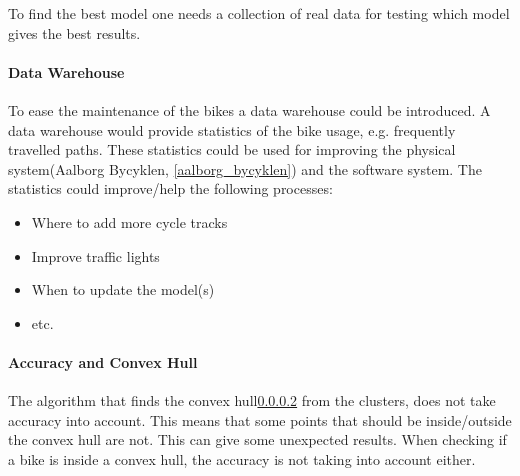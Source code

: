 To find the best model one needs a collection of real data for testing which model gives the best results.

\paragraph{Data Warehouse \cite{data_warehousing}}
To ease the maintenance of the bikes a data warehouse could be introduced.
A data warehouse would provide statistics of the bike usage, e.g. frequently travelled paths.
These statistics could be used for improving the physical system(Aalborg Bycyklen, \cref{aalborg_bycyklen}) and the software system.
The statistics could improve/help the following processes:
\begin{itemize}
\item Where to add more cycle tracks
\item Improve traffic lights
\item When to update the model(s)
\item etc.
\end{itemize}

\paragraph{Accuracy and Convex Hull}
The algorithm that finds the convex hull\cref{} from the clusters, does not take accuracy into account.
This means that some points that should be inside/outside the convex hull are not.
This can give some unexpected results.
When checking if a bike is inside a convex hull, the accuracy is not taking into account either.
